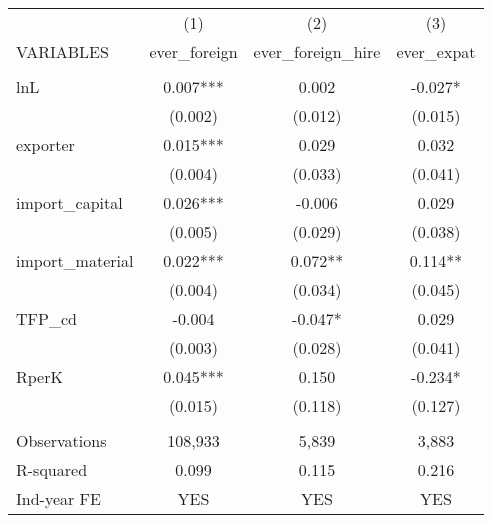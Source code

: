 \begin{tabular}{lccc} \hline
 & (1) & (2) & (3) \\
VARIABLES & ever\_foreign & ever\_foreign\_hire & ever\_expat \\ \hline
 &  &  &  \\
lnL & 0.007*** & 0.002 & -0.027* \\
 & (0.002) & (0.012) & (0.015) \\
exporter & 0.015*** & 0.029 & 0.032 \\
 & (0.004) & (0.033) & (0.041) \\
import\_capital & 0.026*** & -0.006 & 0.029 \\
 & (0.005) & (0.029) & (0.038) \\
import\_material & 0.022*** & 0.072** & 0.114** \\
 & (0.004) & (0.034) & (0.045) \\
TFP\_cd & -0.004 & -0.047* & 0.029 \\
 & (0.003) & (0.028) & (0.041) \\
RperK & 0.045*** & 0.150 & -0.234* \\
 & (0.015) & (0.118) & (0.127) \\
 &  &  &  \\
Observations & 108,933 & 5,839 & 3,883 \\
R-squared & 0.099 & 0.115 & 0.216 \\
 Ind-year FE & YES & YES & YES \\ \hline
\end{tabular}
